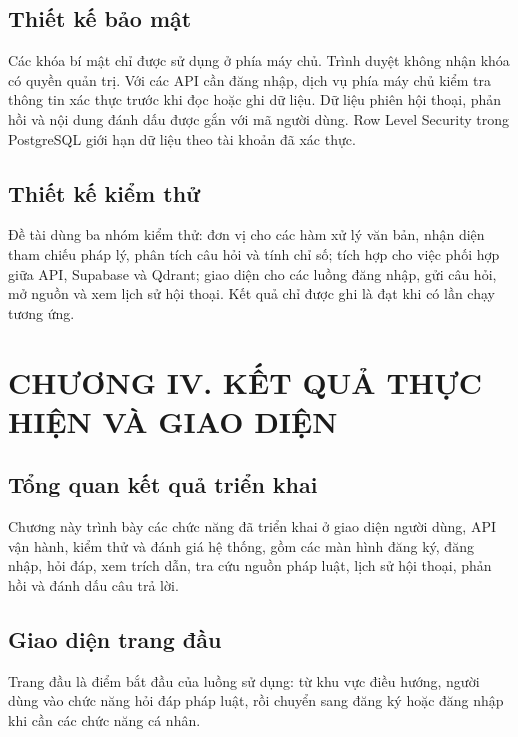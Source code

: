 \documentclass[12pt,a4paper,oneside]{report}
\begin{document}
\section{Thiết kế bảo mật}
Các khóa bí mật chỉ được sử dụng ở phía máy chủ. Trình duyệt không nhận khóa có quyền quản trị. Với các API cần đăng nhập, dịch vụ phía máy chủ kiểm tra thông tin xác thực trước khi đọc hoặc ghi dữ liệu. Dữ liệu phiên hội thoại, phản hồi và nội dung đánh dấu được gắn với mã người dùng. Row Level Security trong PostgreSQL giới hạn dữ liệu theo tài khoản đã xác thực.

\section{Thiết kế kiểm thử}
Đề tài dùng ba nhóm kiểm thử: đơn vị cho các hàm xử lý văn bản, nhận diện tham chiếu pháp lý, phân tích câu hỏi và tính chỉ số; tích hợp cho việc phối hợp giữa API, Supabase và Qdrant; giao diện cho các luồng đăng nhập, gửi câu hỏi, mở nguồn và xem lịch sử hội thoại. Kết quả chỉ được ghi là đạt khi có lần chạy tương ứng.

\clearpage
\setcounter{chapter}{4}
\setcounter{section}{0}
\setcounter{subsection}{0}
\setcounter{figure}{0}
\setcounter{table}{0}
\chapter*{CHƯƠNG IV. KẾT QUẢ THỰC HIỆN VÀ GIAO DIỆN}

\section{Tổng quan kết quả triển khai}
Chương này trình bày các chức năng đã triển khai ở giao diện người dùng, API vận hành, kiểm thử và đánh giá hệ thống, gồm các màn hình đăng ký, đăng nhập, hỏi đáp, xem trích dẫn, tra cứu nguồn pháp luật, lịch sử hội thoại, phản hồi và đánh dấu câu trả lời.

\section{Giao diện trang đầu}
Trang đầu là điểm bắt đầu của luồng sử dụng: từ khu vực điều hướng, người dùng vào chức năng hỏi đáp pháp luật, rồi chuyển sang đăng ký hoặc đăng nhập khi cần các chức năng cá nhân.
\end{document}
